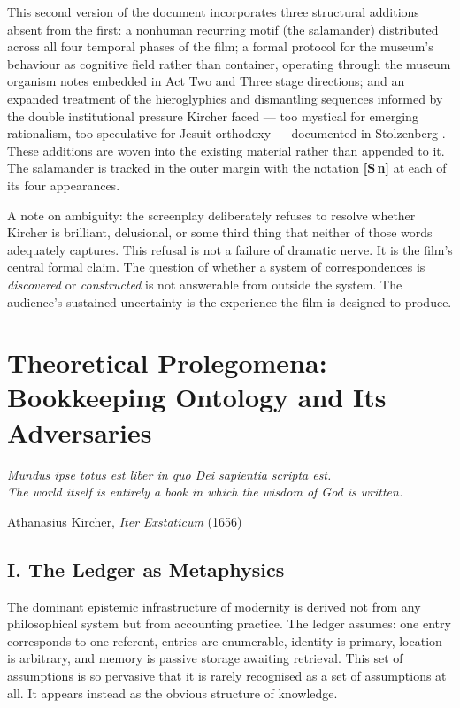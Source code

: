 \documentclass[12pt, a4paper, twoside]{memoir}
\theoremstyle{definition}
\theoremstyle{remark}
\begin{document}
This second version of the document incorporates three structural additions absent from the first: a nonhuman recurring motif (the salamander) distributed across all four temporal phases of the film; a formal protocol for the museum's behaviour as cognitive field rather than container, operating through the museum organism notes embedded in Act Two and Three stage directions; and an expanded treatment of the hieroglyphics and dismantling sequences informed by the double institutional pressure Kircher faced --- too mystical for emerging rationalism, too speculative for Jesuit orthodoxy --- documented in Stolzenberg \cite{stolzenberg2004}. These additions are woven into the existing material rather than appended to it. The salamander is tracked in the outer margin with the notation \textbf{[S\,n]} at each of its four appearances.

A note on ambiguity: the screenplay deliberately refuses to resolve whether Kircher is brilliant, delusional, or some third thing that neither of those words adequately captures. This refusal is not a failure of dramatic nerve. It is the film's central formal claim. The question of whether a system of correspondences is \textit{discovered} or \textit{constructed} is not answerable from outside the system. The audience's sustained uncertainty is the experience the film is designed to produce.

\clearpage

\chapter*{Theoretical Prolegomena: Bookkeeping Ontology and Its Adversaries}

\epigraph{\itshape Mundus ipse totus est liber in quo Dei sapientia scripta est.\\
The world itself is entirely a book in which the wisdom of God is written.}{Athanasius Kircher, \textit{Iter Exstaticum} (1656)}

\section*{I. The Ledger as Metaphysics}

The dominant epistemic infrastructure of modernity is derived not from any philosophical system but from accounting practice. The ledger assumes: one entry corresponds to one referent, entries are enumerable, identity is primary, location is arbitrary, and memory is passive storage awaiting retrieval. This set of assumptions is so pervasive that it is rarely recognised as a set of assumptions at all. It appears instead as the obvious structure of knowledge.
\end{document}
